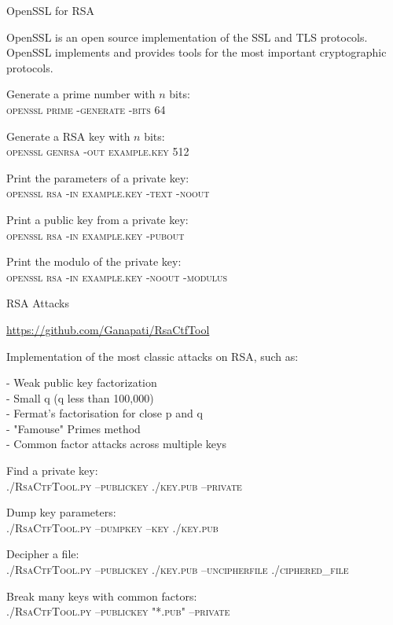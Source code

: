 \documentclass[handout, xcolor=dvipsnames,aspectratio=169]{beamer}
\begin{document}
\begin{frame}{OpenSSL for RSA}

  OpenSSL is an open source implementation of the SSL and TLS protocols. OpenSSL implements and provides tools for the most important cryptographic protocols.

  \medskip

  Generate a prime number with $n$ bits:\\ \phantom{ - } \textsc{openssl prime -generate -bits 64}

  Generate a RSA key with $n$ bits:\\ \phantom{ - } \textsc{openssl genrsa -out example.key 512}

  Print the parameters of a private key:\\ \phantom{ - } \textsc{openssl rsa -in example.key -text -noout}

  Print a public key from a private key:\\ \phantom{ - } \textsc{openssl rsa -in example.key -pubout}

  Print the modulo of the private key:\\ \phantom{ - } \textsc{openssl rsa -in example.key -noout -modulus}


\end{frame}

\begin{frame}{RSA Attacks}

  \url{https://github.com/Ganapati/RsaCtfTool}

  Implementation of the most classic attacks on RSA, such as:

  \small

  \medskip

  - Weak public key factorization\\
  - Small q (q less than 100,000)\\
  - Fermat's factorisation for close p and q\\
  - "Famouse" Primes method\\
  - Common factor attacks across multiple keys\\

  \medskip

  Find a private key:\\
  \phantom{    } \textsc{./RsaCtfTool.py --publickey ./key.pub --private}

  Dump key parameters:\\
  \phantom{    } \textsc{./RsaCtfTool.py --dumpkey --key ./key.pub}

  Decipher a file:\\
  \phantom{    } \textsc{./RsaCtfTool.py --publickey ./key.pub --uncipherfile ./ciphered\_file}

  Break many keys with common factors:\\
  \phantom{    } \textsc{./RsaCtfTool.py --publickey "*.pub" --private}


\end{frame}
\end{document}
